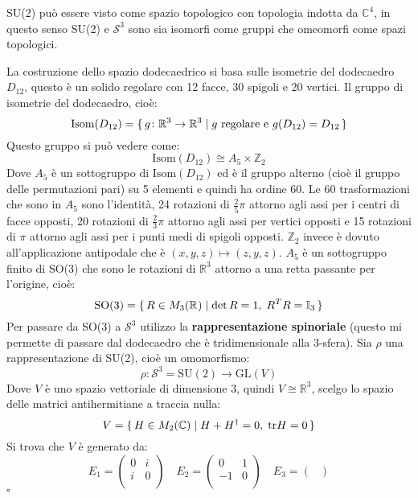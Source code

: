 \documentclass[10pt, twoside=false, x11names]{scrbook}
\newenvironment{proof}{{\textbf{Dimostrazione}:}}{\hfill $\square$}
\newcommand{\Z}{\mathbb{Z}}
\newcommand{\RN}[1][]{\mathbb{R}^#1}
\newcommand{\Id}[1][]{\mathbb{I}_#1}
\newcommand{\Sph}[1][]{\mathcal{S}^#1}
\newcommand{\tr}{\mathrm{tr}}
\begin{document}
\begin{proof}
  SU(2) può essere visto come spazio topologico con topologia indotta da $ \mathbb{C}^4 $,
  in questo senso SU(2) e $ \Sph{3} $ sono sia isomorfi come gruppi che omeomorfi
  come spazi topologici.

  La costruzione dello spazio dodecaedrico si basa sulle isometrie del dodecaedro $ D_{12} $,
  questo è un solido regolare con 12 facce, 30 spigoli e 20 vertici.
  Il gruppo di isometrie del dodecaedro, cioè:
  \[
    \mathrm{Isom}(D_{12}) = \set{ g \colon \RN{3} \to \RN{3} | g \text{ regolare e } g(D_{12}) = D_{12}}
  \]
  Questo gruppo si può vedere come:
  \[
    \mathrm{Isom}(D_{12}) \cong A_5 \times \Z_2
  \]
  Dove $ A_5 $ è un sottogruppo di $ \mathrm{Isom}(D_{12}) $ ed è il gruppo
  alterno (cioè il gruppo delle permutazioni pari) su 5 elementi e quindi ha ordine 60.
  Le 60 trasformazioni che sono in $ A_5 $ sono l'identità, 24 rotazioni di $ \frac{2}{5} \pi $ attorno
  agli assi per i centri di facce opposti, 20 rotazioni di $ \frac{2}{3} \pi $ attorno
  agli assi per vertici opposti e 15 rotazioni di $ \pi $ attorno agli assi per
  i punti medi di spigoli opposti.
  $ \Z_2 $ invece è dovuto all'applicazione antipodale che è $ (x,y,z) \mapsto (z,y,z) $.
  $ A_5 $ è un sottogruppo finito di SO(3) che sono le rotazioni di $ \RN{3} $ attorno
  a una retta passante per l'origine, cioè:
  \[
    \mathrm{SO(3)} = \set{ R \in M_3(\RN{}) | \det{R} = 1, \;R^T R = \Id{3}}
  \]
  Per passare da SO(3) a $ \Sph{3} $ utilizzo la \textbf{rappresentazione spinoriale}
  (questo mi permette di passare dal dodecaedro che è tridimensionale alla $ 3 $-sfera).
  Sia $ \rho $ una rappresentazione di SU(2), cioè un omomorfismo:
  \[
    \rho \colon \Sph{3} = \mathrm{SU(2)} \to \mathrm{GL}(V)
  \]
  Dove $ V $ è uno spazio vettoriale di dimensione 3, quindi $ V \cong \RN{3} $, scelgo
  lo spazio delle matrici antihermitiane a traccia nulla:
  \[
    V = \set{H \in M_2(\mathbb{C}) | H + H^\dagger = 0, \; \tr H  = 0}
  \]
  Si trova che $ V $ è generato da:
  \[
    E_1 =
    \begin{pmatrix}
      0 & i \\
      i & 0 \\
    \end{pmatrix}
    \quad
    E_2 =
    \begin{pmatrix}
      0 & 1 \\
      -1 & 0 \\
    \end{pmatrix}
    \quad
    E_3 =
    \begin{pmatrix}

\end{pmatrix}\]
\end{proof}
\end{document}
